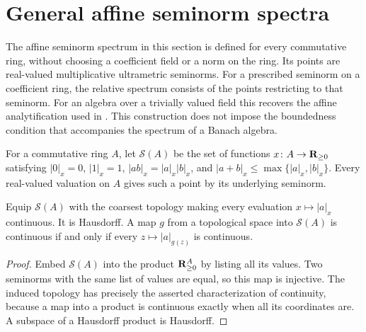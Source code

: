\section{General affine seminorm spectra}\label{sec:spectrum-foundations}

The affine seminorm spectrum in this section is defined for every commutative ring,
without choosing a coefficient field or a norm on the ring. Its points are real-valued
multiplicative ultrametric seminorms. For a prescribed seminorm on a coefficient ring,
the relative spectrum consists of the points restricting to that seminorm.
For an algebra over a trivially valued field this recovers the affine analytification
used in \cite[\S2.1]{FHX}. This construction does not impose the boundedness condition
that accompanies the spectrum of a Banach algebra.

\begin{definition}\label{spectrum:affine-seminorm}
\leanok
For a commutative ring $A$, let $\mathcal S(A)$ be the set of functions
$x\colon A\to\mathbf{R}_{\ge0}$ satisfying $|0|_x=0$, $|1|_x=1$,
$|ab|_x=|a|_x|b|_x$, and $|a+b|_x\le\max\{|a|_x,|b|_x\}$.
Every real-valued valuation on $A$ gives such a point by its underlying seminorm.
\end{definition}

\begin{lemma}\label{spectrum:topology}
\leanok
{}
Equip $\mathcal S(A)$ with the coarsest topology making every evaluation
$x\mapsto|a|_x$ continuous. It is Hausdorff. A map $g$ from a topological
space into $\mathcal S(A)$ is continuous if and only if every
$z\mapsto|a|_{g(z)}$ is continuous.
\end{lemma}
\begin{proof}
Embed $\mathcal S(A)$ into the product $\mathbf{R}_{\ge0}^A$ by listing all its values.
Two seminorms with the same list of values are equal, so this map is injective.
The induced topology has precisely the asserted characterization of continuity,
because a map into a product is continuous exactly when all its coordinates are.
A subspace of a Hausdorff product is Hausdorff.
\end{proof}

